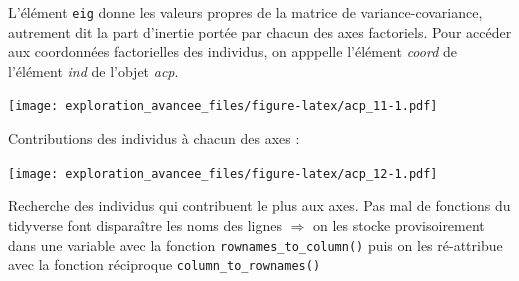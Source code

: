 \documentclass[]{book}
\newenvironment{Shaded}{\begin{snugshade}}{\end{snugshade}}
\newcommand{\DataTypeTok}[1]{\textcolor[rgb]{0.13,0.29,0.53}{#1}}
\newcommand{\DecValTok}[1]{\textcolor[rgb]{0.00,0.00,0.81}{#1}}
\newcommand{\KeywordTok}[1]{\textcolor[rgb]{0.13,0.29,0.53}{\textbf{#1}}}
\newcommand{\NormalTok}[1]{#1}
\newcommand{\OperatorTok}[1]{\textcolor[rgb]{0.81,0.36,0.00}{\textbf{#1}}}
\newcommand{\StringTok}[1]{\textcolor[rgb]{0.31,0.60,0.02}{#1}}
\begin{document}
L'élément \texttt{eig} donne les valeurs propres de la matrice de variance-covariance, autrement dit la part d'inertie portée par chacun des axes factoriels. Pour accéder aux coordonnées factorielles des individus, on apppelle l'élément \emph{coord} de l'élément \emph{ind} de l'objet \emph{acp}.

\begin{Shaded}
\end{Shaded}

\texttt{[image: exploration\_avancee\_files/figure-latex/acp\_11-1.pdf]}

Contributions des individus à chacun des axes :

\begin{Shaded}
\end{Shaded}

\texttt{[image: exploration\_avancee\_files/figure-latex/acp\_12-1.pdf]}

Recherche des individus qui contribuent le plus aux axes. Pas mal de fonctions du tidyverse font disparaître les noms des lignes \(\Rightarrow\) on les stocke provisoirement dans une variable avec la fonction \texttt{rownames\_to\_column()} puis on les ré-attribue avec la fonction réciproque \texttt{column\_to\_rownames()}
\end{document}
